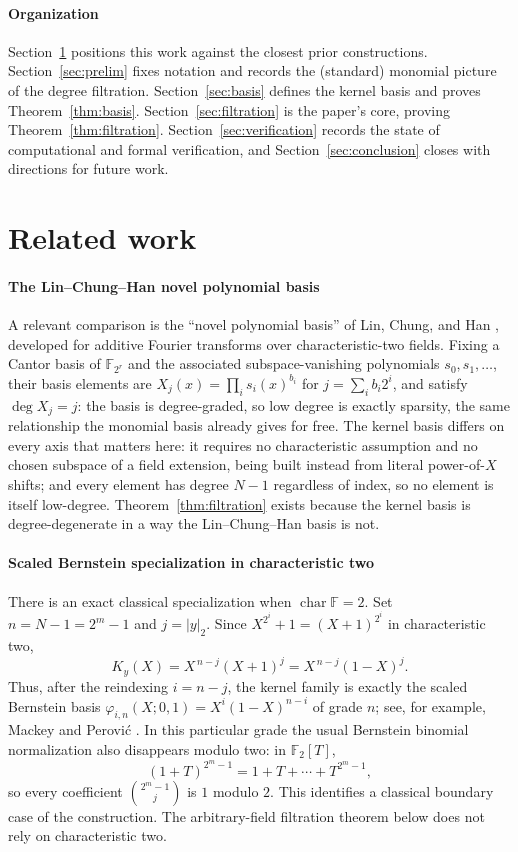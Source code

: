 \documentclass[preprint,3p,12pt,numbers]{elsarticle}
\theoremstyle{definition}
\theoremstyle{remark}
\begin{document}
\paragraph{Organization}
Section~\ref{sec:related} positions this work against the closest prior
constructions. Section~\ref{sec:prelim} fixes notation and records the
(standard) monomial picture of the degree filtration.
Section~\ref{sec:basis} defines the kernel basis and proves
Theorem~\ref{thm:basis}. Section~\ref{sec:filtration} is the paper's core,
proving Theorem~\ref{thm:filtration}. Section~\ref{sec:verification}
records the state of computational and formal verification, and
Section~\ref{sec:conclusion} closes with directions for future work.

\section{Related work}
\label{sec:related}

\paragraph{The Lin--Chung--Han novel polynomial basis}
A relevant comparison is the ``novel polynomial basis''
of Lin, Chung, and Han \citep{LinChungHan2014}, developed for additive
Fourier transforms over characteristic-two fields. Fixing a Cantor basis
of $\mathbb{F}_{2^r}$ and the associated subspace-vanishing polynomials
$s_0, s_1, \dots$, their basis elements are $X_j(x) = \prod_i s_i(x)^{b_i}$
for $j = \sum_i b_i 2^i$, and satisfy $\deg X_j = j$: the basis is
degree-graded, so low degree is exactly sparsity, the same relationship
the monomial basis already gives for free. The kernel basis differs on
every axis that matters here: it requires no characteristic assumption
and no chosen subspace of a field extension, being built instead from
literal power-of-$X$ shifts; and every element has degree $N-1$ regardless
of index, so no element is itself low-degree. Theorem~\ref{thm:filtration}
exists because the kernel basis is degree-degenerate in a way the
Lin--Chung--Han basis is not.

\paragraph{Scaled Bernstein specialization in characteristic two}
There is an exact classical specialization when
$\operatorname{char}\mathbb{F}=2$. Set $n=N-1=2^m-1$ and
$j=|y|_2$. Since $X^{2^i}+1=(X+1)^{2^i}$ in characteristic two,
\[
  K_y(X)=X^{\,n-j}(X+1)^j=X^{\,n-j}(1-X)^j .
\]
Thus, after the reindexing $i=n-j$, the kernel family is exactly the
scaled Bernstein basis
$\varphi_{i,n}(X;0,1)=X^i(1-X)^{n-i}$ of grade $n$; see, for example,
Mackey and Perovi\'c \citep{MackeyPerovic2016}. In this particular grade
the usual Bernstein binomial normalization also disappears modulo two:
in $\mathbb{F}_2[T]$,
\[
  (1+T)^{2^m-1}=1+T+\cdots+T^{2^m-1},
\]
so every coefficient $\binom{2^m-1}{j}$ is $1$ modulo $2$. This
identifies a classical boundary case of the construction. The
arbitrary-field filtration theorem below does not rely on characteristic
two.
\end{document}
